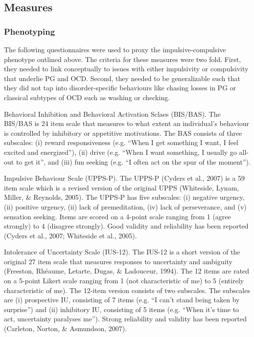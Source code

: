 \subsection{Measures}

\subsubsection{Phenotyping}
	
The following questionnaires were used to proxy the impulsive-compulsive phenotype outlined above. The criteria for these measures were two fold. First, they needed to link conceptually to issues with either impulsivity or compulsivity that underlie PG and OCD. Second, they needed to be generalizable such that they did not tap into disorder-specific behaviours like chasing losses in PG or classical subtypes of OCD such as washing or checking.

Behavioral Inhibition and Behavioral Activation Sclaes (BIS/BAS). The BIS/BAS \cite{Carver_1994} is 24 item scale that measures to what extent an individual’s behaviour is controlled by inhibitory or appetitive motivations. The BAS consists of three subscales: (i) reward responsiveness (e.g. “When I get something I want, I feel excited and energized”), (ii) drive (e.g. “When I want something, I usually go all-out to get it”, and (iii) fun seeking (e.g. “I often act on the spur of the moment”).

Impulsive Behaviour Scale (UPPS-P). The UPPS-P (Cyders et al., 2007) is a 59 item scale which is a revised version of the original UPPS (Whiteside, Lynam, Miller, & Reynolds, 2005).  The UPPS-P has five subscales: (i) negative urgency, (ii) positive urgency, (ii) lack of premeditation, (iv) lack of perseverance, and (v) sensation seeking. Items are scored on a 4-point scale ranging from 1 (agree strongly) to 4 (disagree strongly). Good validity and reliability has been reported (Cyders et al., 2007; Whiteside et al., 2005).

Intolerance of Uncertainty Scale (IUS-12). The IUS-12 is a short version of the original 27 item scale that measures responses to uncertainty and ambiguity (Freeston, Rhéaume, Letarte, Dugas, & Ladouceur, 1994).  The 12 items are rated on a 5-point Likert scale ranging from 1 (not characteristic of me) to 5 (entirely characteristic of me). The 12-item version consists of two subscales. The subscales are (i) prospective IU, consisting of 7 items (e.g. “I can’t stand being taken by surprise”) and (ii) inhibitory IU, consisting of 5 items (e.g. “When it’s time to act, uncertainty paralyses me”).  Strong reliability and validity has been reported (Carleton, Norton, & Asmundson, 2007).

